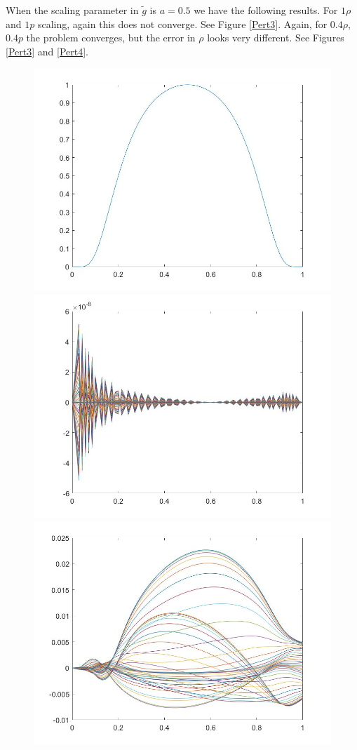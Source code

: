 \documentclass[11pt, a4paper]{article}
\theoremstyle{definition}
\begin{document}
	When the scaling parameter in $\tilde g$ is $a = 0.5$ we have the following results. For $1\rho$ and $1p$ scaling, again this does not converge. See Figure \ref{Pert3}. Again, for $0.4\rho$, $0.4 p$ the problem converges, but the error in $\rho$ looks very different. See Figures \ref{Pert3} and \ref{Pert4}.
		\begin{figure}[h]
		\includegraphics[scale=0.25]{Pert05.jpg}
		\includegraphics[scale=0.25]{ErrPert05.jpg}
		\includegraphics[scale=0.25]{ErrrhoPert05.jpg}

\end{figure}
\end{document}
